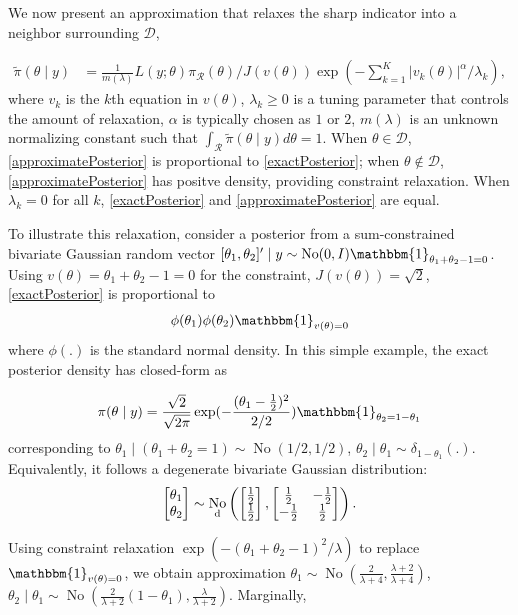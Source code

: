 \documentclass[10pt]{article}
\newcommand{\be}{\begin{equation}\begin{aligned}}
\newcommand{\ee}{\end{aligned}\end{equation}}
\newcommand{\mc}[1]{\mathcal{#1}}
\DeclareMathOperator{\No}{No}
\DeclareMathOperator{\1}{\mathbbm{1}}
\begin{document}
We now present an approximation that relaxes the sharp indicator into a
neighbor surrounding $\mc D$,

\be
\label{approximatePosterior}
\tilde{\pi}(\theta\mid y)  & = \frac{1}{m(\lambda)} L(y;\theta) \pi_{\mc
R}(\theta) /J(v(\theta)) \exp (- \sum_{k=1}^K |v_k(\theta)|^\alpha/\lambda_k),
\ee
where $v_k$ is the $k$th equation in $v(\theta)$, $\lambda_k\ge 0$ is a
tuning parameter that controls the amount of relaxation, $\alpha$ is
typically chosen as $1$ or $2$, $m(\lambda)$ is an unknown normalizing
constant such that $\int_{\mc R} \tilde{\pi}(\theta\mid y) d\theta=1$.
When $\theta\in \mc D$, \eqref{approximatePosterior} is proportional to
\eqref{exactPosterior}; when $\theta\not\in \mc D$,
\eqref{approximatePosterior} has positve density, providing constraint
relaxation. When $\lambda_k=0$ for all $k$, \eqref{exactPosterior} and
\eqref{approximatePosterior} are equal.

To illustrate this relaxation, consider a posterior from a sum-constrained
bivariate Gaussian random vector $[\theta_1,\theta_2]' \mid y \sim \No(0,I)
\mathbbm{1}_{\theta_1+\theta_2-1=0}$. Using
$v(\theta)=\theta_1+\theta_2-1=0$ for the
constraint, $J(v(\theta))=\sqrt 2$, \eqref{exactPosterior} is proportional to 
$$
\phi(\theta_1)
\phi(\theta_2)\mathbbm{1}_{v(\theta)=0}
$$
where $\phi(.)$ is the standard
normal density. In this simple example, the exact posterior density has closed-form
as

$$
\pi(\theta\mid y)=\frac{\sqrt{2}}{\sqrt{2\pi}} \exp(-\frac{(\theta_1-\frac{1}{2})^2}{2/2})
\mathbbm{1}_{\theta_2=1-\theta_1}
$$
corresponding to $\theta_1\mid (\theta_1+ \theta_2=1) \sim
\No(1/2,1/2)$, $\theta_2\mid \theta_1 \sim \delta_{1-\theta_1}(.)$.
Equivalently, it follows a degenerate bivariate Gaussian distribution:
$$\begin{bmatrix} \theta_1 \\ \theta_2 \end{bmatrix} \sim
\No_{\text d} \left(
 \begin{bmatrix} \frac{1}{2} \\ \frac{1}{2} \end{bmatrix},
\begin{bmatrix} \frac{1}{2} & -\frac{1}{2}  \\  -\frac{1}{2}  & \frac{1}{2} \end{bmatrix}
\right).$$

Using constraint relaxation $ \exp( - (\theta_1+\theta_2-1)^2/\lambda)$ to
replace $\mathbbm{1}_{v(\theta)=0}$, we obtain approximation $\theta_1 \sim \No(\frac{2}{\lambda+4},\frac{\lambda+2}{\lambda+4})$, $\theta_2\mid \theta_1 \sim \No(\frac{2}{\lambda+2}(1-\theta_1),\frac{\lambda}{\lambda+2})$. Marginally, 
\end{document}
